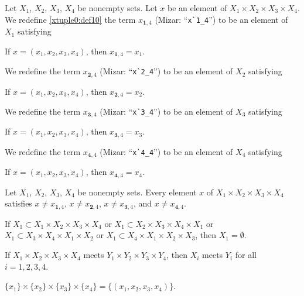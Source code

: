 \documentclass{article}
\begin{document}
\begin{definition}
Let $X_{1}$, $X_{2}$, $X_{3}$, $X_{4}$ be nonempty sets.
Let $x$ be an element of $X_{1}\times X_{2}\times X_{3}\times X_{4}$.
We redefine \eqref{xtuple0:def10} the term $x_{\mathbf{1},4}$ (Mizar: ``\verb#x`1_4#'')
to be an element of $X_{1}$ satisfying
\begin{defn}
\item If $x=(x_{1},x_{2},x_{3},x_{4})$, then $x_{\mathbf{1},4}=x_{1}$.
\end{defn}
We redefine the term $x_{\mathbf{2},4}$ (Mizar: ``\verb#x`2_4#'')
to be an element of $X_{2}$ satisfying
\begin{defn}
\item If $x=(x_{1},x_{2},x_{3},x_{4})$, then $x_{\mathbf{2},4}=x_{2}$.
\end{defn}
We redefine the term $x_{\mathbf{3},4}$ (Mizar: ``\verb#x`3_4#'')
to be an element of $X_{3}$ satisfying
\begin{defn}
\item If $x=(x_{1},x_{2},x_{3},x_{4})$, then $x_{\mathbf{3},4}=x_{3}$.
\end{defn}
We redefine the term $x_{\mathbf{4},4}$ (Mizar: ``\verb#x`4_4#'')
to be an element of $X_{4}$ satisfying
\begin{defn}
\item If $x=(x_{1},x_{2},x_{3},x_{4})$, then $x_{\mathbf{4},4}=x_{4}$.
\end{defn}
\end{definition}

\begin{thm}
\item\label{mcart1:58} Let $X_{1}$, $X_{2}$, $X_{3}$, $X_{4}$ be nonempty sets.
  Every element $x$ of $X_{1}\times X_{2}\times X_{3}\times X_{4}$
  satisfies
  $x\neq x_{\mathbf{1},4}$, $x\neq x_{\mathbf{2},4}$, $x\neq x_{\mathbf{3},4}$, and $x\neq x_{\mathbf{4},4}$.
\item\label{mcart1:59} If $X_{1}\subset X_{1}\times X_{2}\times X_{3}\times X_{4}$
  or $X_{1}\subset X_{2}\times X_{3}\times X_{4}\times X_{1}$
  or $X_{1}\subset X_{3}\times X_{4}\times X_{1}\times X_{2}$
  or $X_{1}\subset X_{4}\times X_{1}\times X_{2}\times X_{3}$,
  then $X_{1}=\emptyset$.
\item\label{mcart1:60} If $X_{1}\times X_{2}\times X_{3}\times X_{4}$ meets
  $Y_{1}\times Y_{2}\times Y_{3}\times Y_{4}$, then
  $X_{i}$ meets $Y_{i}$ for all $i=1,2,3,4$.
\item\label{mcart1:61} $\{x_{1}\}\times\{x_{2}\}\times\{x_{3}\}\times\{x_{4}\}=\{(x_{1},x_{2},x_{3},x_{4})\}$.
\end{thm}
\end{document}
